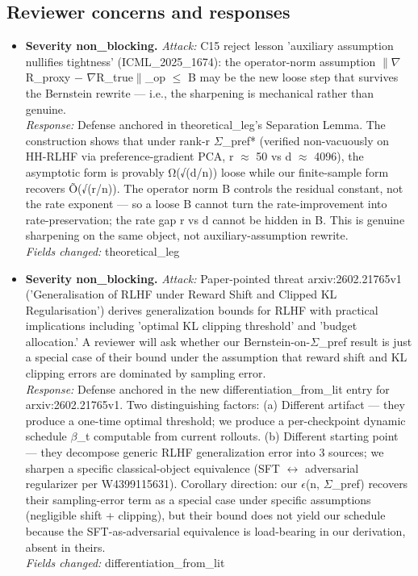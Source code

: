 \documentclass[10pt,a4paper]{article}
\begin{document}
\begin{tcolorbox}[colback=bgskill, colframe=cblue, title=\textbf{NoveltySkill — Idea Card (L3 Oral-Ready)}, breakable]
\section*{Reviewer concerns and responses}
\begin{itemize}[leftmargin=*]
  \item \textbf{Severity non\_blocking.} \emph{Attack:} C15 reject lesson 'auxiliary assumption nullifies tightness' (ICML\_2025\_1674): the operator-norm assumption $\|$$\nabla$R\_proxy − $\nabla$R\_true$\|$\_op $\le$ B may be the new loose step that survives the Bernstein rewrite --- i.e., the sharpening is mechanical rather than genuine. \\ \emph{Response:} Defense anchored in theoretical\_leg's Separation Lemma. The construction shows that under rank-r $\Sigma$\_pref* (verified non-vacuously on HH-RLHF via preference-gradient PCA, r $\approx$ 50 vs d $\approx$ 4096), the asymptotic form is provably Ω(√(d/n)) loose while our finite-sample form recovers Õ(√(r/n)). The operator norm B controls the residual constant, not the rate exponent --- so a loose B cannot turn the rate-improvement into rate-preservation; the rate gap r vs d cannot be hidden in B. This is genuine sharpening on the same object, not auxiliary-assumption rewrite. \\ \emph{Fields changed:} theoretical\_leg
  \item \textbf{Severity non\_blocking.} \emph{Attack:} Paper-pointed threat arxiv:2602.21765v1 ('Generalisation of RLHF under Reward Shift and Clipped KL Regularisation') derives generalization bounds for RLHF with practical implications including 'optimal KL clipping threshold' and 'budget allocation.' A reviewer will ask whether our Bernstein-on-$\Sigma$\_pref result is just a special case of their bound under the assumption that reward shift and KL clipping errors are dominated by sampling error. \\ \emph{Response:} Defense anchored in the new differentiation\_from\_lit entry for arxiv:2602.21765v1. Two distinguishing factors: (a) Different artifact --- they produce a one-time optimal threshold; we produce a per-checkpoint dynamic schedule $\beta$\_t computable from current rollouts. (b) Different starting point --- they decompose generic RLHF generalization error into 3 sources; we sharpen a specific classical-object equivalence (SFT $\leftrightarrow$ adversarial regularizer per W4399115631). Corollary direction: our $\epsilon$(n, $\Sigma$\_pref) recovers their sampling-error term as a special case under specific assumptions (negligible shift + clipping), but their bound does not yield our schedule because the SFT-as-adversarial equivalence is load-bearing in our derivation, absent in theirs. \\ \emph{Fields changed:} differentiation\_from\_lit
\end{itemize}

\end{tcolorbox}
\end{document}

